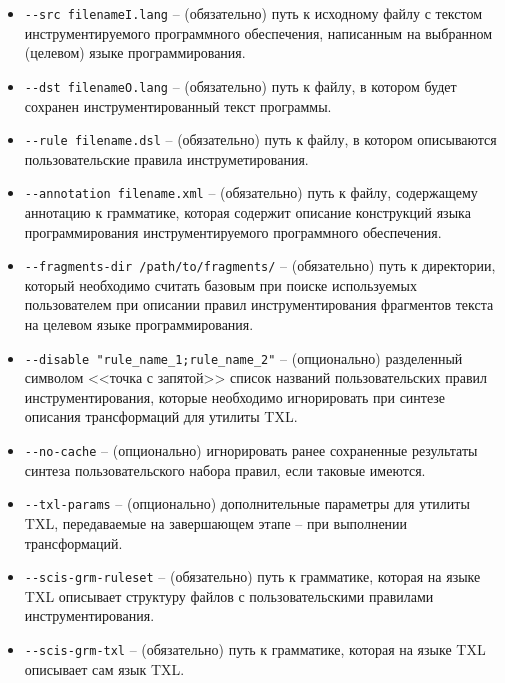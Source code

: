 \begin{itemize}[noitemsep]
  \item \lstinline{--src filenameI.lang}                -- (обязательно)
  путь к исходному файлу с текстом инструментируемого программного обеспечения, написанным на выбранном (целевом) языке программирования.

  \item \lstinline{--dst filenameO.lang}                -- (обязательно)
  путь к файлу, в котором будет сохранен инструментированный текст программы.

  \item \lstinline{--rule filename.dsl}                 -- (обязательно)
  путь к файлу, в котором описываются пользовательские правила инструметирования.

  \item \lstinline{--annotation filename.xml}           -- (обязательно)
  путь к файлу, содержащему аннотацию к грамматике, которая содержит описание конструкций языка программирования инструментируемого программного обеспечения.

  \item \lstinline{--fragments-dir /path/to/fragments/} -- (обязательно)
  путь к директории, который необходимо считать базовым при поиске используемых пользователем при описании правил инструментирования фрагментов текста на целевом языке программирования.

  \item \lstinline{--disable "rule_name_1;rule_name_2"} -- (опционально)
  разделенный символом <<точка с запятой>> список названий пользовательских правил инструментирования, которые необходимо игнорировать при синтезе описания трансформаций для утилиты TXL.

  \item \lstinline{--no-cache}         -- (опционально)
  игнорировать ранее сохраненные результаты синтеза пользовательского набора правил, если таковые имеются.

  \item \lstinline{--txl-params}       -- (опционально)
  дополнительные параметры для утилиты TXL, передаваемые на завершающем этапе -- при выполнении трансформаций.

  \item \lstinline{--scis-grm-ruleset} -- (обязательно)
  путь к грамматике, которая на языке TXL описывает структуру файлов с пользовательскими правилами инструментирования.
  \item \lstinline{--scis-grm-txl}     -- (обязательно)
  путь к грамматике, которая на языке TXL описывает сам язык TXL.
\end{itemize}

